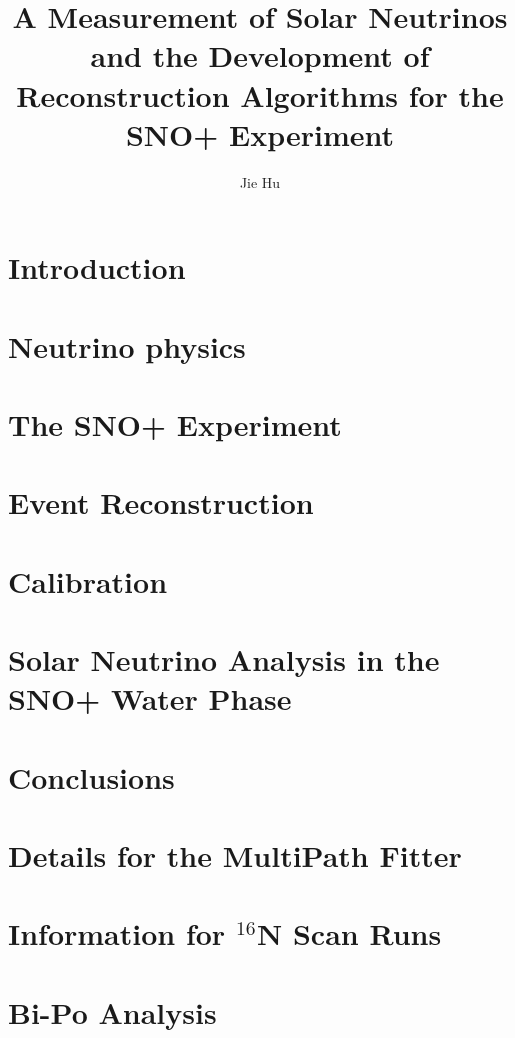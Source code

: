 \documentclass[phd,black]{PrincetonThesis}
\title{A Measurement of Solar Neutrinos and the Development of Reconstruction Algorithms for the SNO+ Experiment}
\author{Jie Hu}
\begin{document}
\begin{frontmatter}
  
\begin{thesisabstract}

\end{thesisabstract}
  
\begin{acknowledgements}

\end{acknowledgements}
 
\end{frontmatter}

\cleardoublepage
\chapter{Introduction}

\chapter{Neutrino physics}

\chapter{The SNO+ Experiment}

\chapter{Event Reconstruction}

\chapter{Calibration}

\chapter{Solar Neutrino Analysis in the SNO+ Water Phase}

\chapter{Conclusions}


\appendix
\cleardoublepage
\chapter{Details for the MultiPath Fitter}

\chapter{Information for $^{16}$N Scan Runs}

\chapter{Bi-Po Analysis}

%

\cleardoublepage

\end{document}

